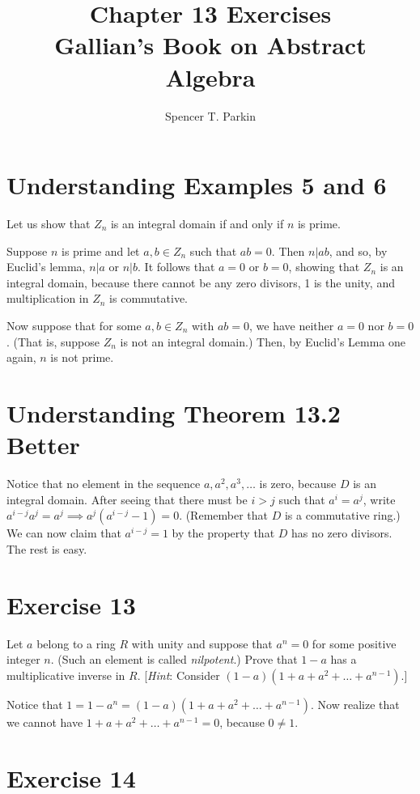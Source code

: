 \documentclass[12pt]{article}
\title{Chapter 13 Exercises\\Gallian's Book on Abstract Algebra}
\author{Spencer T. Parkin}
\begin{document}
\maketitle

\section*{Understanding Examples 5 and 6}

Let us show that $Z_n$ is an integral domain if and only if $n$ is prime.

Suppose $n$ is prime and let $a,b\in Z_n$ such that $ab=0$.
Then $n|ab$, and so, by Euclid's lemma, $n|a$ or $n|b$.
It follows that $a=0$ or $b=0$, showing that $Z_n$ is an integral
domain, because there cannot be any zero divisors, 1 is the unity,
and multiplication in $Z_n$ is commutative.

Now suppose that for some $a,b\in Z_n$ with $ab=0$,
we have neither $a=0$ nor $b=0$.  (That is, suppose $Z_n$
is not an integral domain.)  Then, by Euclid's Lemma one again,
$n$ is not prime.

\section*{Understanding Theorem 13.2 Better}

Notice that no element in the sequence $a, a^2, a^3,\dots$ is zero,
because $D$ is an integral domain.  After seeing that there must
be $i>j$ such that $a^i=a^j$, write $a^{i-j}a^j=a^j\implies a^j(a^{i-j}-1)=0$.
(Remember that $D$ is a commutative ring.)  We can now claim that
$a^{i-j}=1$ by the property that $D$ has no zero divisors.
The rest is easy.

\section*{Exercise 13}

Let $a$ belong to a ring $R$ with unity and suppose that $a^n=0$ for
some positive integer $n$.  (Such an element is called {\it nilpotent}.)
Prove that $1-a$ has a multiplicative inverse in $R$.  [{\it Hint}: Consider
$(1-a)(1+a+a^2+\dots+a^{n-1})$.]

Notice that $1=1-a^n=(1-a)(1+a+a^2+\dots+a^{n-1})$.
Now realize that we cannot have $1+a+a^2+\dots+a^{n-1}=0$,
because $0\neq 1$.

\section*{Exercise 14}
\end{document}
